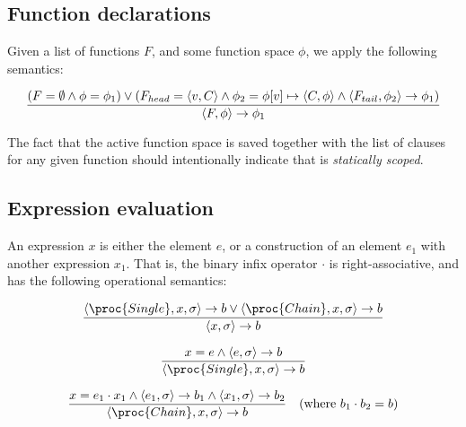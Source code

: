\subsection{Function declarations}

Given a list of functions $F$, and some function space $\phi$, we apply the
following semantics:

\begin{equation}\label{sem:declaration}
{\displaystyle
  \left(
      F=\emptyset
    \wedge
      \phi=\phi_1
  \right)
  \vee
  \left(
      F_{head}=\left\langle v,C\right\rangle
    \wedge
      \phi_2=\phi[v]\mapsto \left\langle C,\phi\right\rangle
    \wedge
      \left\langle F_{tail},\phi_2\right\rangle
      \rightarrow
      \phi_1
  \right)
\over\displaystyle
  \left\langle F, \phi\right\rangle
  \rightarrow
  \phi_1
}
\end{equation}

The fact that the active function space is saved together with the list of
clauses for any given function should intentionally indicate that \D{} is
\emph{statically scoped}.

\subsection{Expression evaluation}

An expression $x$ is either the element $e$, or a construction of an element
$e_1$ with another expression $x_1$. That is, the binary infix operator $\cdot$
is right-associative, and has the following operational semantics:

\everymath{\displaystyle}

\begin{equation}
{\displaystyle
  \left\langle \proc{Single}, x,\sigma\right\rangle
  \rightarrow
  b
\vee
  \left\langle \proc{Chain}, x,\sigma\right\rangle
  \rightarrow
  b
\over\displaystyle
  \left\langle x,\sigma\right\rangle
  \rightarrow
  b
}
\end{equation}

\begin{equation}
{\displaystyle
  x = e
\wedge
  \left\langle e,\sigma\right\rangle
  \rightarrow
  b
\over\displaystyle
  \left\langle \proc{Single}, x,\sigma\right\rangle
  \rightarrow
  b
}
\end{equation}

\begin{equation}
{\displaystyle
  x = e_1\cdot x_1
\wedge
  \left\langle e_1,\sigma\right\rangle
  \rightarrow
  b_1
\wedge
  \left\langle x_1,\sigma\right\rangle
  \rightarrow
  b_2
\over\displaystyle
  \left\langle \proc{Chain}, x, \sigma\right\rangle
  \rightarrow
  b
}
\quad(\text{where }b_1\cdot b_2=b)
\end{equation}

